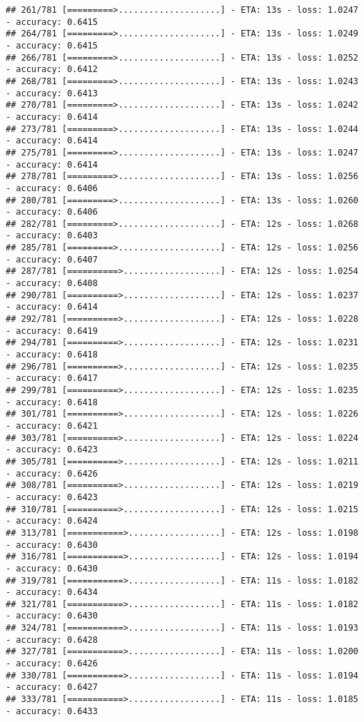 \documentclass[
]{article}
\begin{document}
\begin{verbatim}
## 261/781 [=========>....................] - ETA: 13s - loss: 1.0247 - accuracy: 0.6415
## 264/781 [=========>....................] - ETA: 13s - loss: 1.0249 - accuracy: 0.6415
## 266/781 [=========>....................] - ETA: 13s - loss: 1.0252 - accuracy: 0.6412
## 268/781 [=========>....................] - ETA: 13s - loss: 1.0243 - accuracy: 0.6413
## 270/781 [=========>....................] - ETA: 13s - loss: 1.0242 - accuracy: 0.6414
## 273/781 [=========>....................] - ETA: 13s - loss: 1.0244 - accuracy: 0.6414
## 275/781 [=========>....................] - ETA: 13s - loss: 1.0247 - accuracy: 0.6414
## 278/781 [=========>....................] - ETA: 13s - loss: 1.0256 - accuracy: 0.6406
## 280/781 [=========>....................] - ETA: 13s - loss: 1.0260 - accuracy: 0.6406
## 282/781 [=========>....................] - ETA: 12s - loss: 1.0268 - accuracy: 0.6403
## 285/781 [=========>....................] - ETA: 12s - loss: 1.0256 - accuracy: 0.6407
## 287/781 [==========>...................] - ETA: 12s - loss: 1.0254 - accuracy: 0.6408
## 290/781 [==========>...................] - ETA: 12s - loss: 1.0237 - accuracy: 0.6414
## 292/781 [==========>...................] - ETA: 12s - loss: 1.0228 - accuracy: 0.6419
## 294/781 [==========>...................] - ETA: 12s - loss: 1.0231 - accuracy: 0.6418
## 296/781 [==========>...................] - ETA: 12s - loss: 1.0235 - accuracy: 0.6417
## 299/781 [==========>...................] - ETA: 12s - loss: 1.0235 - accuracy: 0.6418
## 301/781 [==========>...................] - ETA: 12s - loss: 1.0226 - accuracy: 0.6421
## 303/781 [==========>...................] - ETA: 12s - loss: 1.0224 - accuracy: 0.6423
## 305/781 [==========>...................] - ETA: 12s - loss: 1.0211 - accuracy: 0.6426
## 308/781 [==========>...................] - ETA: 12s - loss: 1.0219 - accuracy: 0.6423
## 310/781 [==========>...................] - ETA: 12s - loss: 1.0215 - accuracy: 0.6424
## 313/781 [===========>..................] - ETA: 12s - loss: 1.0198 - accuracy: 0.6430
## 316/781 [===========>..................] - ETA: 12s - loss: 1.0194 - accuracy: 0.6430
## 319/781 [===========>..................] - ETA: 11s - loss: 1.0182 - accuracy: 0.6434
## 321/781 [===========>..................] - ETA: 11s - loss: 1.0182 - accuracy: 0.6430
## 324/781 [===========>..................] - ETA: 11s - loss: 1.0193 - accuracy: 0.6428
## 327/781 [===========>..................] - ETA: 11s - loss: 1.0200 - accuracy: 0.6426
## 330/781 [===========>..................] - ETA: 11s - loss: 1.0194 - accuracy: 0.6427
## 333/781 [===========>..................] - ETA: 11s - loss: 1.0185 - accuracy: 0.6433

\end{verbatim}
\end{document}
